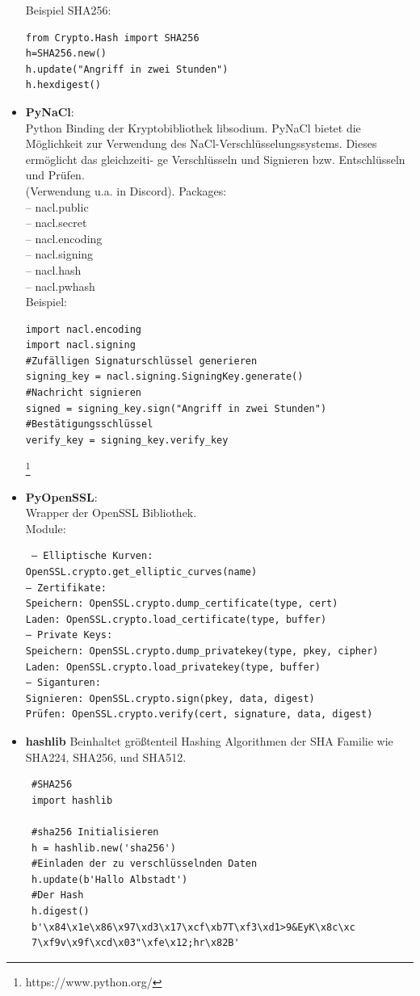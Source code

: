 \documentclass[a4paper,12pt]{scrartcl}
\begin{document}
\begin{itemize}
\begin{verbatim}
\end{verbatim}
Beispiel SHA256:
\begin{verbatim}
from Crypto.Hash import SHA256
h=SHA256.new()
h.update("Angriff in zwei Stunden")
h.hexdigest()
\end{verbatim}

\item \textbf{PyNaCl}:\\
Python Binding der Kryptobibliothek libsodium. PyNaCl bietet die Möglichkeit
zur Verwendung des NaCl-Verschlüsselungssystems. Dieses ermöglicht das gleichzeiti-
ge Verschlüsseln und Signieren bzw. Entschlüsseln und Prüfen.\\ (Verwendung u.a. in
Discord). Packages:\\
– nacl.public\\
– nacl.secret\\
– nacl.encoding\\
– nacl.signing\\
– nacl.hash\\
– nacl.pwhash\\
Beispiel:
\begin{verbatim}
import nacl.encoding
import nacl.signing
#Zufälligen Signaturschlüssel generieren
signing_key = nacl.signing.SigningKey.generate()
#Nachricht signieren
signed = signing_key.sign("Angriff in zwei Stunden")
#Bestätigungsschlüssel
verify_key = signing_key.verify_key
\end{verbatim}
\footnote{https://www.python.org/}
\newpage
\item  \textbf{PyOpenSSL}:\\
Wrapper der OpenSSL Bibliothek. \\Module:
\begin{verbatim}
 – Elliptische Kurven:
OpenSSL.crypto.get_elliptic_curves(name)
– Zertifikate:
Speichern: OpenSSL.crypto.dump_certificate(type, cert)
Laden: OpenSSL.crypto.load_certificate(type, buffer)
– Private Keys:
Speichern: OpenSSL.crypto.dump_privatekey(type, pkey, cipher)
Laden: OpenSSL.crypto.load_privatekey(type, buffer)
– Siganturen:
Signieren: OpenSSL.crypto.sign(pkey, data, digest)
Prüfen: OpenSSL.crypto.verify(cert, signature, data, digest)
\end{verbatim}
\item \textbf{hashlib} Beinhaltet größtenteil Hashing Algorithmen der SHA Familie wie SHA224, SHA256, und SHA512. 
\begin{verbatim}
 #SHA256
 import hashlib

 #sha256 Initialisieren
 h = hashlib.new('sha256')
 #Einladen der zu verschlüsselnden Daten
 h.update(b'Hallo Albstadt')
 #Der Hash
 h.digest()
 b'\x84\x1e\x86\x97\xd3\x17\xcf\xb7T\xf3\xd1>9&EyK\x8c\xc
 7\xf9v\x9f\xcd\x03"\xfe\x12;hr\x82B'
\end{verbatim}


\end{itemize}
\newpage
\end{document}

